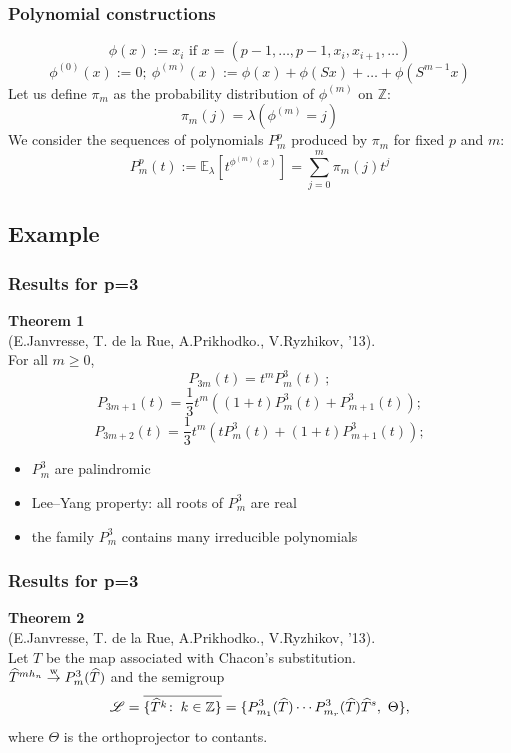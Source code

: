 \begin{frame}


    \frametitle{Polynomial constructions}  
    \[\phi(x):=x_i\text{ if }x=(p-1, \ldots, p-1, x_i, x_{i+1}, \ldots)\]
    \[\phi^{(0)}(x):=0;\ \phi^{(m)}(x):=\phi(x)+\phi(Sx)+\ldots+\phi(S^{m-1}x)\]
    Let us define $\pi_m$ as the probability distribution of $\phi^{(m)}$ on $\mathbb{Z}$:
    \[\pi_m(j) = \lambda(\phi^{(m)}=j)\]
    We consider the sequences of polynomials $P_m^p$ produced by $\pi_m$ for fixed $p$ and $m$:
    \[P_m^p(t):= \mathbb{E}_\lambda\left[ t^{\phi^{(m)}(x)}\right] = \sum\limits_{j=0}^m \pi_m(j) t^j \]
\end{frame}


\subsection{Example}


\begin{frame}
  \frametitle{Results for p=3 }
  {\bf Theorem 1}\\(E.Janvresse, T. de la Rue, A.Prikhodko., V.Ryzhikov, '13).\\ \bigskip 
     For all $m \ge 0$, 
    \[P_{3m}(t)=t^m P_m^3(t)\ ;\]
    \[P_{3m+1}(t)=\frac{1}{3} t^m \left((1+t)P_m^3(t) + P_{m+1}^3(t) \right);\]
    \[P_{3m+2}(t)=\frac{1}{3} t^m \left(tP_m^3(t) + (1+t)P_{m+1}^3(t) \right);\]
      \begin{itemize}
   \item $P_m^3$ are palindromic
   \item Lee--Yang property: all roots of $P_m^3$ are real
   \item the family $P_m^3$ contains many irreducible polynomials
  \end{itemize}
 \end{frame}

\begin{frame}
  \frametitle{Results for p=3 }

  {\bf Theorem 2}\\ (E.Janvresse, T. de la Rue, A.Prikhodko., V.Ryzhikov, '13).\\ \bigskip 
    Let $T$ be the map associated with Chacon's substitution.\\

  $\widehat T^{mh_n} \mathrel{\stackrel{\mathrm w}{\to}} P_m^3(\widehat T)$ and the semigroup 
  $$
    \L = \overline{\{\T^k \where k \in \Set{Z}\}} = \{P_{m_1}^3(\T)\cdots P_{m_r}^3(\T)\T^s,\ \Theta\},
  $$
  where $\Theta$ is the orthoprojector to contants. \\
\end{frame}




